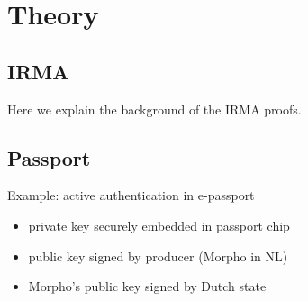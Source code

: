 \section{Theory}
\subsection{IRMA}
Here we explain the background of the IRMA proofs.

\subsection{Passport}
Example: active authentication in e-passport
\begin{itemize}
	\item private key securely embedded in passport chip
  \item public key signed by producer (Morpho in NL)
  \item Morpho's public key signed by Dutch state
\end{itemize}
